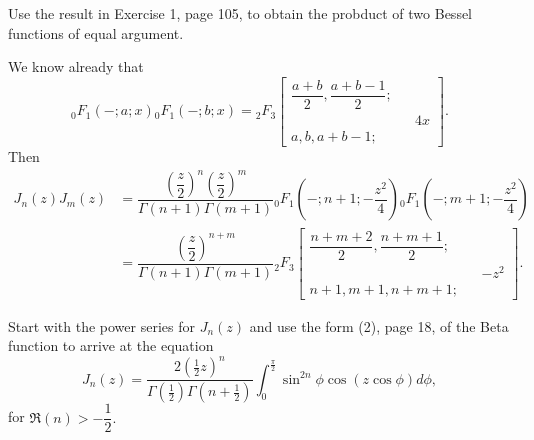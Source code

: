 \begin{problem} \label{problem9chapter6}
Use the result in Exercise 1, page 105, to obtain the probduct of two Bessel functions of equal argument.
\end{problem}
\begin{solution}
We know already that
$${}_0F_1(-;a;x) {}_0F_1(-;b;x) = {}_2F_3 \left[ \begin{array}{rlr}
\dfrac{a+b}{2}, \dfrac{a+b-1}{2}; & & \\
& & 4x \\
a,b,a+b-1; & & 
\end{array} \right].$$
Then
$$\begin{array}{ll}
J_n(z)J_m(z) &= \dfrac{\left( \dfrac{z}{2} \right)^n \left( \dfrac{z}{2} \right)^m}{\Gamma(n+1) \Gamma(m+1)} {}_0F_1(-;n+1; - \dfrac{z^2}{4}) {}_0F_1(-;m+1;-\dfrac{z^2}{4}) \\
&= \dfrac{\left( \dfrac{z}{2} \right)^{n+m}}{\Gamma(n+1) \Gamma(m+1)} {}_2F_3 \left[ \begin{array}{rlr}
\dfrac{n+m+2}{2}, \dfrac{n+m+1}{2}; & & \\
& & -z^2 \\
n+1,m+1, n+m+1; & & 
\end{array} \right].
\end{array}$$
\end{solution}
\begin{problem} \label{problem10chapter6}
Start with the power series for $J_n(z)$ and use the form (2), page 18, of the Beta function to arrive at the equation
$$J_n(z) = \dfrac{2 (\frac{1}{2}z)^n}{\Gamma(\frac{1}{2})\Gamma(n+\frac{1}{2})} \displaystyle\int_0^{\frac{\pi}{2}} \sin^{2n} \phi \cos(z \cos \phi) d\phi,$$
for $\Re(n) > -\dfrac{1}{2}.$
\end{problem}
